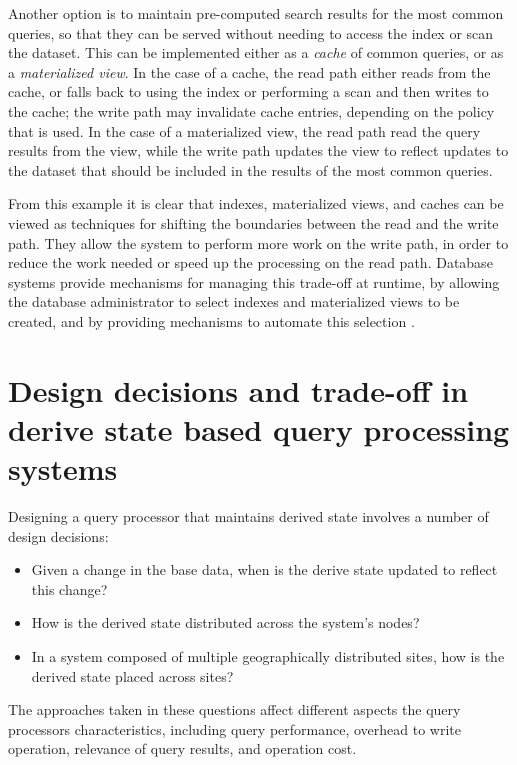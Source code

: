 Another option is to maintain pre-computed search results for the most common queries, so that they can be served
without needing to access the index or scan the dataset.
This can be implemented either as a \textit{cache} of common queries, or as a \textit{materialized view}.
In the case of a cache, the read path either reads from the cache, or falls back to using the index or performing a scan
and then writes to the cache; the write path may invalidate cache entries, depending on the policy that is used.
In the case of a materialized view, the read path read the query results from the view, while the write path updates the
view to reflect updates to the dataset that should be included in the results of the most common queries.

From this example it is clear that indexes, materialized views, and caches can be viewed as techniques for shifting the
boundaries between the read and the write path.
They allow the system to perform more work on the write path, in order to reduce the work needed or speed up the
processing on the read path.
Database systems provide mechanisms for managing this trade-off at runtime, by allowing the database administrator
to select indexes and materialized views to be created, and by providing mechanisms to automate this selection
\cite{valentin:db2advisor, chaudhuri:decadeselftuning}.

\section{Design decisions and trade-off in derive state based query processing systems}

Designing a query processor that maintains derived state involves a number of design decisions:
\begin{itemize}

  \item Given a change in the base data, when is the derive state updated to reflect this change?

  \item How is the derived state distributed across the system's nodes?

  \item In a system composed of multiple geographically distributed sites, how is the derived state placed across sites?

\end{itemize}

The approaches taken in these questions affect different aspects the query processors characteristics, including query
performance, overhead to write operation, relevance of query results, and operation cost.

